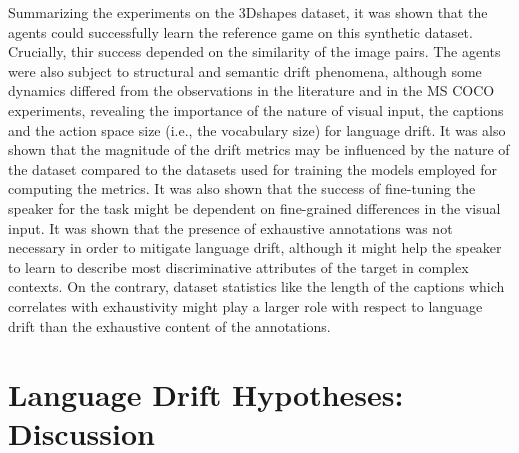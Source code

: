 Summarizing the experiments on the 3Dshapes dataset, it was shown that the agents could successfully learn the reference game on this synthetic dataset. Crucially, thir success depended on the similarity of the image pairs. 
The agents were also subject to structural and semantic drift phenomena, although some dynamics differed from the observations in the literature and in the MS COCO experiments, revealing the importance of the nature of visual input, the captions and the action space size (i.e., the vocabulary size) for language drift. It was also shown that the magnitude of the drift metrics may be influenced by the nature of the dataset compared to the datasets used for training the models employed for computing the metrics. It was also shown that the success of fine-tuning the speaker for the task might be dependent on fine-grained differences in the visual input. 
It was shown that the presence of exhaustive annotations was not necessary in order to mitigate language drift, although it might help the speaker to learn to describe most discriminative attributes of the target in complex contexts. On the contrary, dataset statistics like the length of the captions which correlates with exhaustivity might play a larger role with respect to language drift than the exhaustive content of the annotations.

\section{Language Drift Hypotheses: Discussion}

